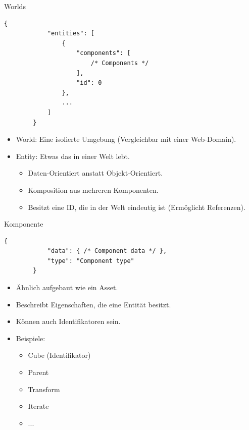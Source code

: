 \documentclass{presentation}
\begin{document}
\begin{frame}[fragile]{Worlds}
    \begin{lstlisting}[style=context]
        {
            "entities": [
                {
                    "components": [
                        /* Components */
                    ],
                    "id": 0
                },
                ...
            ]
        }
    \end{lstlisting}

    \begin{itemize}
        \item World: Eine isolierte Umgebung (Vergleichbar mit einer Web-Domain).
        \item Entity: Etwas das in einer Welt lebt.
        \begin{itemize}
            \item Daten-Orientiert anstatt Objekt-Orientiert.
            \item Komposition aus mehreren Komponenten.
            \item Besitzt eine ID, die in der Welt eindeutig ist (Ermöglicht Referenzen).
        \end{itemize}
    \end{itemize}
\end{frame}

\begin{frame}[fragile]{Komponente}
    \begin{lstlisting}[style=context]
        {
            "data": { /* Component data */ },
            "type": "Component type"
        }
    \end{lstlisting}
    \begin{itemize}
        \item Ähnlich aufgebaut wie ein Asset.
        \item Beschreibt Eigenschaften, die eine Entität besitzt.
        \item Können auch Identifikatoren sein.
        \item Beispiele:
        \begin{itemize}
            \item Cube (Identifikator)
            \item Parent
            \item Transform
            \item Iterate
            \item ...
        \end{itemize}
    \end{itemize}
\end{frame}
\end{document}

